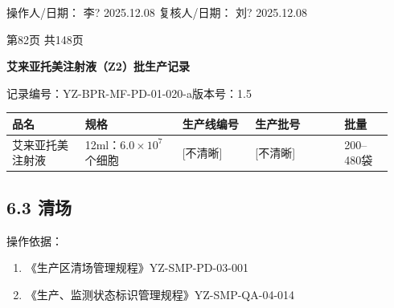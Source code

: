 \documentclass[UTF8,10pt,a4paper,fontset=fandol]{ctexart}
\newcommand{\fieldvalue}[1]{#1}
\newcommand{\handwritten}[1]{#1}
\begin{document}
\medskip

操作人/日期：
\fieldvalue{\handwritten{李?}}
\quad
\fieldvalue{\handwritten{2025.12.08}}
\hfill
复核人/日期：
\fieldvalue{\handwritten{刘?}}
\quad
\fieldvalue{\handwritten{2025.12.08}}

\vfill

\begin{center}
第82页 共148页
\end{center}

\newpage

\begin{center}
\textbf{艾来亚托美注射液（Z2）批生产记录}
\end{center}

\noindent
记录编号：YZ-BPR-MF-PD-01-020-a\hfill 版本号：1.5

\begin{tabular}{|p{0.18\linewidth}|p{0.24\linewidth}|p{0.18\linewidth}|p{0.22\linewidth}|p{0.12\linewidth}|}
\hline
品名 & 规格 & 生产线编号 & 生产批号 & 批量\\
\hline
\fieldvalue{艾来亚托美注射液} &
\fieldvalue{12ml：$6.0\times10^{7}$个细胞} &
\fieldvalue{\handwritten{[不清晰]}} &
\fieldvalue{\handwritten{[不清晰]}} &
\fieldvalue{200--480袋}\\
\hline
\end{tabular}

\subsection*{6.3 清场}

\noindent
操作依据：

\begin{enumerate}
\item 《生产区清场管理规程》\hfill YZ-SMP-PD-03-001
\item 《生产、监测状态标识管理规程》\hfill YZ-SMP-QA-04-014
\end{enumerate}
\end{document}
